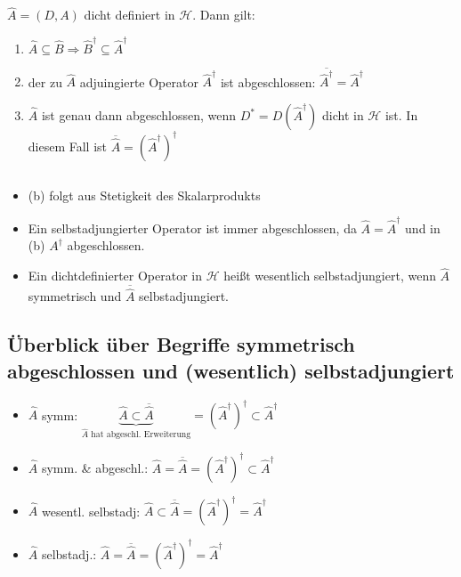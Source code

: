 \begin{Satz}
    $\hat{A} = (D,A)$ dicht definiert in $\mathcal{H}$. Dann gilt:
    \begin{enumerate}[label=(\alph*)]
        \item $\hat{A} \subseteq \hat{B} \Rightarrow \hat{B}^\dagger \subseteq \hat{A}^\dagger$
        \item der zu $\hat{A}$ adjuingierte Operator  $\hat{A}^\dagger$ ist abgeschlossen:
                $\overline{\hat{A}^\dagger} = \hat{A}^\dagger$
        \item $\hat{A}$ ist genau dann abgeschlossen, wenn $D^\ast = D(\hat{A}^\dagger)$ dicht in
                $\mathcal{H}$ ist. In diesem Fall ist $\overline{\hat{A}} =
                \left(\hat{A}^\dagger\right)^\dagger$
    \end{enumerate}
\end{Satz}

\begin{Bem}{$\textrm{ }$ \newline} %
    \begin{itemize}
        \item (b) folgt aus Stetigkeit des Skalarprodukts
        \item Ein selbstadjungierter Operator ist immer abgeschlossen, da $\hat{A} = \hat{A}^\dagger$ und
                in (b)  $A^\dagger$ abgeschlossen.
        \item Ein dichtdefinierter Operator in $\mathcal{H}$ heißt wesentlich selbstadjungiert, wenn 
                $\hat{A}$ symmetrisch und $\overline{\hat{A}}$ selbstadjungiert.
    \end{itemize}
\end{Bem}

\subsection{Überblick über Begriffe symmetrisch abgeschlossen und (wesentlich) selbstadjungiert}
\begin{itemize}
    \item $\hat{A}$ symm: $\underbrace{\hat{A} \subset \overline{\hat{A}}}_{\hat{A} \textrm{ hat 
            abgeschl. Erweiterung}} = \left(\hat{A}^\dagger\right)^\dagger \subset \hat{A}^\dagger$
    \item $\hat{A}$ symm. \& abgeschl.: $\hat{A} = \overline{\hat{A}} = \left(\hat{A}^\dagger\right)^\dagger
            \subset \hat{A}^\dagger$
    \item $\hat{A}$ wesentl. selbstadj: $\hat{A} \subset \overline{\hat{A}} =
            \left(\hat{A}^\dagger\right)^\dagger = \hat{A}^\dagger$
    \item $\hat{A}$ selbstadj.: $\hat{A} = \overline{\hat{A}} = \left(\hat{A}^\dagger\right)^\dagger =
            \hat{A}^\dagger$
\end{itemize}

